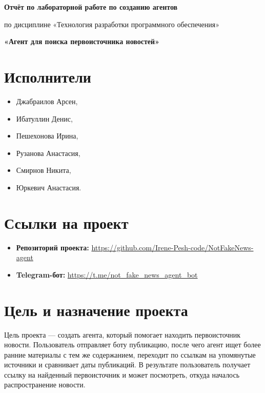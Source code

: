 \documentclass[11pt,a4paper]{article}
\begin{document}
\begin{center}
    {\Large\bfseries Отчёт по лабораторной работе по созданию агентов}

    \vspace{0.4em}
    {\large по дисциплине «Технология разработки программного обеспечения»}

    \vspace{0.7em}
    {\Large\bfseries «Агент для поиска первоисточника новостей»}
\end{center}

\section*{Исполнители}

\begin{itemize}[leftmargin=1.8em]
    \item Джабраилов Арсен,
    \item Ибатуллин Денис,
    \item Пешехонова Ирина,
    \item Рузанова Анастасия,
    \item Смирнов Никита,
    \item Юркевич Анастасия.
\end{itemize}

\section*{Ссылки на проект}

\begin{itemize}[leftmargin=1.8em]
    \item \textbf{Репозиторий проекта:} \url{https://github.com/Irene-Pesh-code/NotFakeNews-agent}
    \item \textbf{Telegram-бот:} \url{https://t.me/not_fake_news_agent_bot}
\end{itemize}

\section*{Цель и назначение проекта}

Цель проекта --- создать агента, который помогает находить первоисточник новости. Пользователь отправляет боту публикацию, после чего агент ищет более ранние материалы с тем же содержанием, переходит по ссылкам на упомянутые источники и сравнивает даты публикаций. В результате пользователь получает ссылку на найденный первоисточник и может посмотреть, откуда началось распространение новости.
\end{document}
